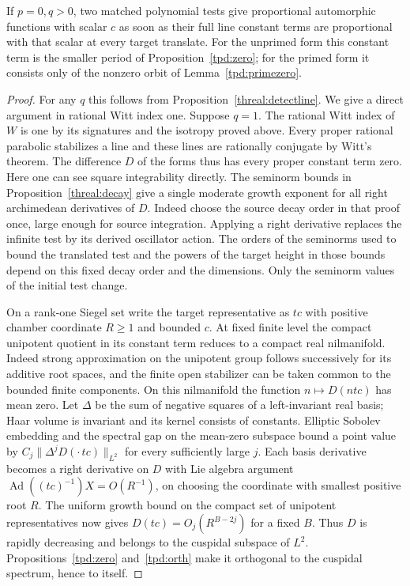 \begin{corollary}\label{tpd:detect}
If \(p=0,q>0\), two matched polynomial tests give proportional
automorphic functions with scalar \(c\) as soon as their full line
constant terms are proportional with that scalar at every target
translate. For the unprimed form this constant term is the smaller
period of Proposition~\ref{tpd:zero}; for the primed form it consists
only of the nonzero orbit of Lemma~\ref{tpd:primezero}.
\end{corollary}
\begin{proof}
For any \(q\) this follows from Proposition~\ref{threal:detectline}.
We give a direct argument in rational Witt index one.
Suppose \(q=1\).
The rational Witt index of \(W\) is one by its signatures and the
isotropy proved above. Every proper rational parabolic stabilizes a
line and these lines are rationally conjugate by Witt's theorem. The
difference \(D\) of the forms thus has every proper constant term zero.
Here one can see square integrability directly. The seminorm bounds
in Proposition~\ref{threal:decay} give a single moderate growth
exponent for all right archimedean derivatives of \(D\). Indeed
choose the source decay order in that proof once, large enough for
source integration. Applying a right derivative replaces the infinite
test by its derived oscillator action. The orders of the seminorms
used to bound the translated test and the powers of the target
height in those bounds depend on this fixed decay order and the
dimensions. Only the seminorm values of the initial test change.

On a rank-one Siegel set write the target representative as \(tc\)
with positive chamber coordinate \(R\ge1\) and bounded \(c\).
At fixed finite level the compact unipotent quotient in its constant
term reduces to a compact real nilmanifold. Indeed strong
approximation on the unipotent group follows successively for its
additive root spaces, and the finite open stabilizer can be taken
common to the bounded finite components. On this nilmanifold the
function \(n\mapsto D(ntc)\) has mean zero. Let \(\Delta\) be
the sum of negative squares of a left-invariant real basis; Haar
volume is invariant and its kernel consists of constants. Elliptic
Sobolev embedding and the spectral gap on the mean-zero subspace
bound a point value by \(C_j\|\Delta^jD(\cdot\,tc)\|_{L^2}\)
for every sufficiently large \(j\). Each basis derivative becomes
a right derivative on \(D\) with Lie algebra argument
\(\operatorname{Ad}((tc)^{-1})X=O(R^{-1})\), on choosing the
coordinate with smallest positive root \(R\). The uniform growth
bound on the compact set of unipotent representatives now gives
\(D(tc)=O_j(R^{B-2j})\) for a fixed \(B\). Thus \(D\) is rapidly
decreasing and belongs to the cuspidal subspace of \(L^2\).
Propositions~\ref{tpd:zero} and~\ref{tpd:orth} make it orthogonal
to the cuspidal spectrum, hence to itself.
\end{proof}

